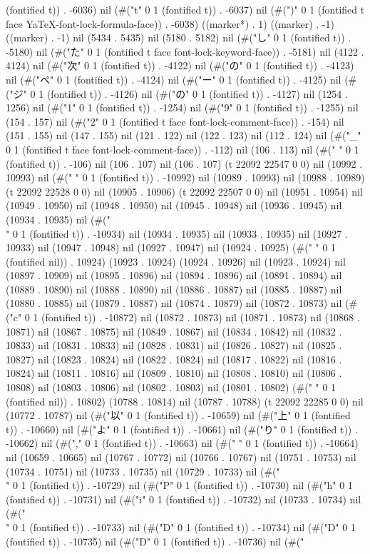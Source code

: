 (fontified t)) . -6036) nil (#("t" 0 1 (fontified t)) . -6037) nil (#(")" 0 1 (fontified t face YaTeX-font-lock-formula-face)) . -6038) ((marker*) . 1) ((marker) . -1) ((marker) . -1) nil (5434 . 5435) nil (5180 . 5182) nil (#("し" 0 1 (fontified t)) . -5180) nil (#("た" 0 1 (fontified t face font-lock-keyword-face)) . -5181) nil (4122 . 4124) nil (#("次" 0 1 (fontified t)) . -4122) nil (#("の" 0 1 (fontified t)) . -4123) nil (#("ペ" 0 1 (fontified t)) . -4124) nil (#("ー" 0 1 (fontified t)) . -4125) nil (#("ジ" 0 1 (fontified t)) . -4126) nil (#("の" 0 1 (fontified t)) . -4127) nil (1254 . 1256) nil (#("1" 0 1 (fontified t)) . -1254) nil (#("9" 0 1 (fontified t)) . -1255) nil (154 . 157) nil (#("2" 0 1 (fontified t face font-lock-comment-face)) . -154) nil (151 . 155) nil (147 . 155) nil (121 . 122) nil (122 . 123) nil (112 . 124) nil (#("_" 0 1 (fontified t face font-lock-comment-face)) . -112) nil (106 . 113) nil (#(" " 0 1 (fontified t)) . -106) nil (106 . 107) nil (106 . 107) (t 22092 22547 0 0) nil (10992 . 10993) nil (#(" " 0 1 (fontified t)) . -10992) nil (10989 . 10993) nil (10988 . 10989) (t 22092 22528 0 0) nil (10905 . 10906) (t 22092 22507 0 0) nil (10951 . 10954) nil (10949 . 10950) nil (10948 . 10950) nil (10945 . 10948) nil (10936 . 10945) nil (10934 . 10935) nil (#("\\" 0 1 (fontified t)) . -10934) nil (10934 . 10935) nil (10933 . 10935) nil (10927 . 10933) nil (10947 . 10948) nil (10927 . 10947) nil (10924 . 10925) (#(" " 0 1 (fontified nil)) . 10924) (10923 . 10924) (10924 . 10926) nil (10923 . 10924) nil (10897 . 10909) nil (10895 . 10896) nil (10894 . 10896) nil (10891 . 10894) nil (10889 . 10890) nil (10888 . 10890) nil (10886 . 10887) nil (10885 . 10887) nil (10880 . 10885) nil (10879 . 10887) nil (10874 . 10879) nil (10872 . 10873) nil (#("c" 0 1 (fontified t)) . -10872) nil (10872 . 10873) nil (10871 . 10873) nil (10868 . 10871) nil (10867 . 10875) nil (10849 . 10867) nil (10834 . 10842) nil (10832 . 10833) nil (10831 . 10833) nil (10828 . 10831) nil (10826 . 10827) nil (10825 . 10827) nil (10823 . 10824) nil (10822 . 10824) nil (10817 . 10822) nil (10816 . 10824) nil (10811 . 10816) nil (10809 . 10810) nil (10808 . 10810) nil (10806 . 10808) nil (10803 . 10806) nil (10802 . 10803) nil (10801 . 10802) (#(" " 0 1 (fontified nil)) . 10802) (10788 . 10814) nil (10787 . 10788) (t 22092 22285 0 0) nil (10772 . 10787) nil (#("以" 0 1 (fontified t)) . -10659) nil (#("上" 0 1 (fontified t)) . -10660) nil (#("よ" 0 1 (fontified t)) . -10661) nil (#("り" 0 1 (fontified t)) . -10662) nil (#("," 0 1 (fontified t)) . -10663) nil (#(" " 0 1 (fontified t)) . -10664) nil (10659 . 10665) nil (10767 . 10772) nil (10766 . 10767) nil (10751 . 10753) nil (10734 . 10751) nil (10733 . 10735) nil (10729 . 10733) nil (#("\\" 0 1 (fontified t)) . -10729) nil (#("P" 0 1 (fontified t)) . -10730) nil (#("h" 0 1 (fontified t)) . -10731) nil (#("i" 0 1 (fontified t)) . -10732) nil (10733 . 10734) nil (#("\\" 0 1 (fontified t)) . -10733) nil (#("D" 0 1 (fontified t)) . -10734) nil (#("D" 0 1 (fontified t)) . -10735) nil (#("D" 0 1 (fontified t)) . -10736) nil (#("
